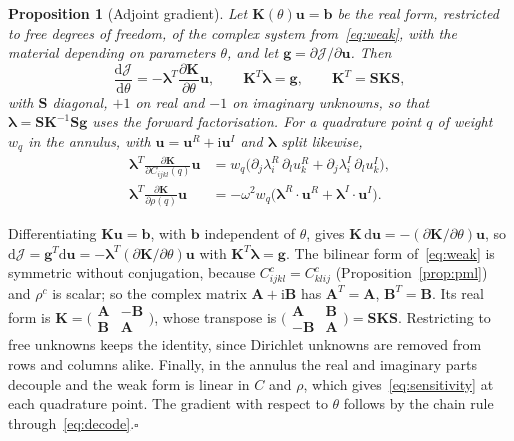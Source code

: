 \documentclass[preprint,12pt]{elsarticle}
\newcommand{\mbf}[1]{\mathbf{#1}}
\newcommand{\be}{\begin{equation}}
\newcommand{\ee}{\end{equation}}
\newcommand{\qedbox}{\hfill$\square$}
\newtheorem{proposition}{Proposition}
\begin{document}
\begin{proposition}[Adjoint gradient]\label{prop:adjoint}
Let $\mbf{K}(\theta)\mbf{u}=\mbf{b}$ be the real form, restricted to free degrees of freedom, of the complex system from~\eqref{eq:weak}, with
the material depending on parameters $\theta$, and let $\mbf{g}=\partial\mathcal{J}/\partial\mbf{u}$. Then
\be\label{eq:adjoint}
\frac{\mathrm{d}\mathcal{J}}{\mathrm{d}\theta}=-\boldsymbol{\lambda}^T\frac{\partial\mbf{K}}{\partial\theta}\mbf{u},\qquad
\mbf{K}^T\boldsymbol{\lambda}=\mbf{g},\qquad \mbf{K}^T=\mbf{S}\mbf{K}\mbf{S},
\ee
with $\mbf{S}$ diagonal, $+1$ on real and $-1$ on imaginary unknowns, so that $\boldsymbol{\lambda}=\mbf{S}\mbf{K}^{-1}\mbf{S}\mbf{g}$ uses the
forward factorisation. For a quadrature point $q$ of weight $w_q$ in the annulus, with $\mbf{u}=\mbf{u}^R+\mathrm{i}\mbf{u}^I$ and
$\boldsymbol{\lambda}$ split likewise,
\be\label{eq:sensitivity}
\begin{aligned}
\boldsymbol{\lambda}^T\frac{\partial\mbf{K}}{\partial C_{ijkl}(q)}\mbf{u}&=w_q\bigl(\partial_j\lambda^R_i\,\partial_lu^R_k+\partial_j\lambda^I_i\,\partial_lu^I_k\bigr),\\
\boldsymbol{\lambda}^T\frac{\partial\mbf{K}}{\partial\rho(q)}\mbf{u}&=-\omega^2w_q\bigl(\boldsymbol{\lambda}^R\!\cdot\mbf{u}^R+\boldsymbol{\lambda}^I\!\cdot\mbf{u}^I\bigr).
\end{aligned}
\ee
\end{proposition}

\begin{pf}
Differentiating $\mbf{K}\mbf{u}=\mbf{b}$, with $\mbf{b}$ independent of $\theta$, gives $\mbf{K}\,\mathrm{d}\mbf{u}=-(\partial\mbf{K}/\partial\theta)\mbf{u}$,
so $\mathrm{d}\mathcal{J}=\mbf{g}^T\mathrm{d}\mbf{u}=-\boldsymbol{\lambda}^T(\partial\mbf{K}/\partial\theta)\mbf{u}$ with $\mbf{K}^T\boldsymbol{\lambda}=\mbf{g}$.
The bilinear form of~\eqref{eq:weak} is symmetric without conjugation, because $C^c_{ijkl}=C^c_{klij}$ (Proposition~\ref{prop:pml})
and $\rho^c$ is scalar; so the complex matrix $\mbf{A}+\mathrm{i}\mbf{B}$ has $\mbf{A}^T=\mbf{A}$, $\mbf{B}^T=\mbf{B}$. Its real form is
$\mbf{K}=\bigl(\begin{smallmatrix}\mbf{A}&-\mbf{B}\\ \mbf{B}&\mbf{A}\end{smallmatrix}\bigr)$, whose transpose is
$\bigl(\begin{smallmatrix}\mbf{A}&\mbf{B}\\ -\mbf{B}&\mbf{A}\end{smallmatrix}\bigr)=\mbf{S}\mbf{K}\mbf{S}$. Restricting to free unknowns keeps the identity,
since Dirichlet unknowns are removed from rows and columns alike. Finally, in the annulus the real and imaginary parts decouple and
the weak form is linear in $C$ and $\rho$, which gives~\eqref{eq:sensitivity} at each quadrature point. The gradient with respect to $\theta$
follows by the chain rule through~\eqref{eq:decode}.\qedbox
\end{pf}
\end{document}
